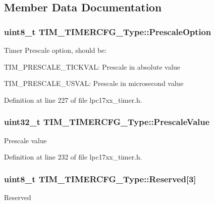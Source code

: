 \subsection{\-Member \-Data \-Documentation}
\hypertarget{struct_t_i_m___t_i_m_e_r_c_f_g___type_a0a8d60fc3231a6d3c71345778bd67ccc}{
\subsubsection[{\-Prescale\-Option}]{\setlength{\rightskip}{0pt plus 5cm}uint8\-\_\-t {\bf \-T\-I\-M\-\_\-\-T\-I\-M\-E\-R\-C\-F\-G\-\_\-\-Type\-::\-Prescale\-Option}}}\label{struct_t_i_m___t_i_m_e_r_c_f_g___type_a0a8d60fc3231a6d3c71345778bd67ccc}
\-Timer \-Prescale option, should be\-:
\begin{DoxyItemize}
\item \-T\-I\-M\-\_\-\-P\-R\-E\-S\-C\-A\-L\-E\-\_\-\-T\-I\-C\-K\-V\-A\-L\-: \-Prescale in absolute value
\item \-T\-I\-M\-\_\-\-P\-R\-E\-S\-C\-A\-L\-E\-\_\-\-U\-S\-V\-A\-L\-: \-Prescale in microsecond value 
\end{DoxyItemize}

\-Definition at line 227 of file lpc17xx\-\_\-timer.\-h.

\hypertarget{struct_t_i_m___t_i_m_e_r_c_f_g___type_a899dc9dc69989b4b205c985c2f3e1c14}{
\subsubsection[{\-Prescale\-Value}]{\setlength{\rightskip}{0pt plus 5cm}uint32\-\_\-t {\bf \-T\-I\-M\-\_\-\-T\-I\-M\-E\-R\-C\-F\-G\-\_\-\-Type\-::\-Prescale\-Value}}}\label{struct_t_i_m___t_i_m_e_r_c_f_g___type_a899dc9dc69989b4b205c985c2f3e1c14}
\-Prescale value 

\-Definition at line 232 of file lpc17xx\-\_\-timer.\-h.

\hypertarget{struct_t_i_m___t_i_m_e_r_c_f_g___type_a7d22d4785d54ea3b663590d6295856fe}{
\subsubsection[{\-Reserved}]{\setlength{\rightskip}{0pt plus 5cm}uint8\-\_\-t {\bf \-T\-I\-M\-\_\-\-T\-I\-M\-E\-R\-C\-F\-G\-\_\-\-Type\-::\-Reserved}\mbox{[}3\mbox{]}}}\label{struct_t_i_m___t_i_m_e_r_c_f_g___type_a7d22d4785d54ea3b663590d6295856fe}
\-Reserved 

